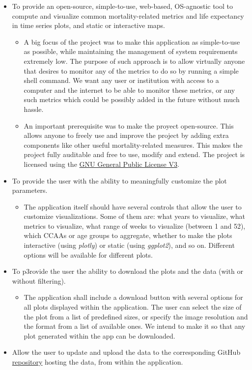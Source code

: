 \documentclass[
  a4paper]{article}
\providecommand{\tightlist}{%
  \setlength{\itemsep}{0pt}\setlength{\parskip}{0pt}}
\begin{document}
\begin{itemize}
\item
  To provide an open-source, simple-to-use, web-based, OS-agnostic tool
  to compute and visualize common mortality-related metrics and life
  expectancy in time series plots, and static or interactive maps.

  \begin{itemize}
  \item
    A big focus of the project was to make this application as
    simple-to-use as possible, while maintaining the management of
    system requirements extremely low. The purpose of such approach is
    to allow virtually anyone that desires to monitor any of the metrics
    to do so by running a simple shell command. We want any user or
    institution with access to a computer and the internet to be able to
    monitor these metrics, or any such metrics which could be possibly
    added in the future without much hassle.
  \item
    An important prerequisite was to make the proyect open-source. This
    allows anyone to freely use and improve the project by adding extra
    components like other useful mortality-related measures. This makes
    the project fully auditable and free to use, modify and extend. The
    project is licensed using the
    \href{https://www.gnu.org/licenses/gpl-3.0.en.html}{GNU General
    Public License V3}.
  \end{itemize}
\item
  To provide the user with the ability to meaningfully customize the
  plot parameters.

  \begin{itemize}
  \tightlist
  \item
    The application itself should have several controls that allow the
    user to customize visualizations. Some of them are: what years to
    visualize, what metrics to visualize, what range of weeks to
    visualize (between 1 and 52), which CCAAs or age groups to
    aggregate, whether to make the plots interactive (using
    \emph{plotly}) or static (using \emph{ggplot2}), and so on.
    Different options will be available for different plots.
  \end{itemize}
\item
  To p3rovide the user the ability to download the plots and the data
  (with or without filtering).

  \begin{itemize}
  \tightlist
  \item
    The application shall include a download button with several options
    for all plots displayed within the application. The user can select
    the size of the plot from a list of predefined sizes, or specify the
    image resolution and the format from a list of available ones. We
    intend to make it so that any plot generated within the app can be
    downloaded.
  \end{itemize}
\item
  Allow the user to update and upload the data to the corresponding
  GitHub \href{https://github.com/dreth/tfm_uc3m_data}{repository}
  hosting the data, from within the application.


\end{itemize}
\end{document}
